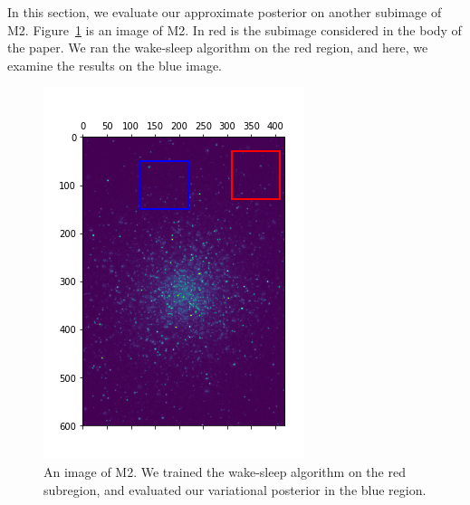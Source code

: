 In this section, we evaluate our approximate posterior on another subimage of M2. Figure~\ref{fig:marked_m2} is an image of M2. In red is the subimage considered in the body of the paper. 
We ran the wake-sleep algorithm on the red region, and here, we examine the results on the blue image. 


\begin{figure}
    \centering
    \includegraphics{figures/sdss_m2_image2_marked.png}
    \caption{An image of M2. We trained the wake-sleep algorithm on the red subregion, and evaluated our variational posterior in the blue region. }
    \label{fig:marked_m2}
\end{figure}

